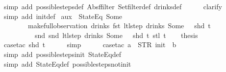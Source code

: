 \begin{isabellebody}
\ {\isacharparenleft}simp\ add{\isacharcolon}\ possible{\isacharunderscore}steps{\isacharunderscore}def\ Abs{\isacharunderscore}ffilter\ Set{\isachardot}filter{\isacharunderscore}def\ drinks{\isacharunderscore}def{\isacharparenright}\isanewline
\ \ \ \ \isamarkupfalse%
\ clarify\isanewline
\ \ \ \ \isamarkupfalse%
\ {\isacharparenleft}simp\ add{\isacharcolon}\ init{\isacharunderscore}def{\isacharparenright}%
\endisatagproof
{\isafoldproof}%
%
\isadelimproof
\isanewline
%
\endisadelimproof
\isanewline
{}\isamarkupfalse%
\ aux{}{\isacharcolon}\ {\isachardoublequoteopen}{\isasymnot}\ StateEq\ {\isacharparenleft}Some\ {}{\isacharparenright}\isanewline
\ \ \ \ \ \ \ \ {\isacharparenleft}make{\isacharunderscore}full{\isacharunderscore}observation\ drinks\ {\isacharparenleft}fst\ {\isacharparenleft}ltl{\isacharunderscore}step\ drinks\ {\isacharparenleft}Some\ {}{\isacharparenright}\ {\isacharless}{\isachargreater}\ {\isacharparenleft}shd\ t{\isacharparenright}{\isacharparenright}{\isacharparenright}\isanewline
\ \ \ \ \ \ \ \ \ \ {\isacharparenleft}snd\ {\isacharparenleft}snd\ {\isacharparenleft}ltl{\isacharunderscore}step\ drinks\ {\isacharparenleft}Some\ {}{\isacharparenright}\ {\isacharless}{\isachargreater}\ {\isacharparenleft}shd\ t{\isacharparenright}{\isacharparenright}{\isacharparenright}{\isacharparenright}\ {\isacharparenleft}stl\ t{\isacharparenright}{\isacharparenright}{\isachardoublequoteclose}\isanewline
%
\isadelimproof
%
\endisadelimproof
%
\isatagproof
{}\isamarkupfalse%
{\isacharminus}\isanewline
\ \ \isamarkupfalse%
\ {\isacharquery}thesis\isanewline
\ \ \ \ \isamarkupfalse%
\ {\isacharparenleft}case{\isacharunderscore}tac\ {\isachardoublequoteopen}shd\ t{\isachardoublequoteclose}{\isacharparenright}\isanewline
\ \ \ \ \isamarkupfalse%
\ simp\isanewline
\ \ \ \ \isamarkupfalse%
\ {\isacharparenleft}case{\isacharunderscore}tac\ {\isachardoublequoteopen}a\ {\isacharequal}\ STR\ {\isacharprime}{\isacharprime}init{\isacharprime}{\isacharprime}\ {\isasymand}\ b\ {\isacharequal}\ {\isacharbrackleft}{\isacharbrackright}{\isachardoublequoteclose}{\isacharparenright}\isanewline
\ \ \ \ \ \isamarkupfalse%
\ {\isacharparenleft}simp\ add{\isacharcolon}\ possible{\isacharunderscore}steps{\isacharunderscore}init\ StateEq{\isacharunderscore}def{\isacharparenright}\isanewline
\ \ \ \ \isamarkupfalse%
\ {\isacharparenleft}simp\ add{\isacharcolon}\ StateEq{\isacharunderscore}def\ possible{\isacharunderscore}steps{\isacharunderscore}not{\isacharunderscore}init{\isacharparenright}\isanewline

\end{isabellebody}

